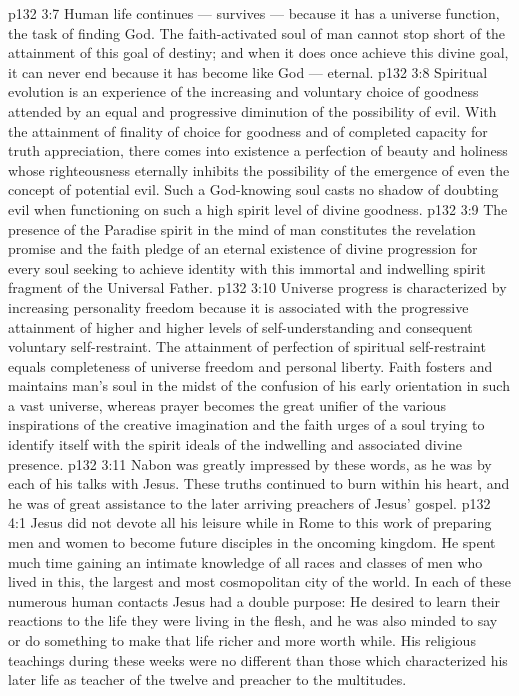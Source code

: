 \vs p132 3:7 Human life continues --- survives --- because it has a universe function, the task of finding God. The faith\hyp{}activated soul of man cannot stop short of the attainment of this goal of destiny; and when it does once achieve this divine goal, it can never end because it has become like God --- eternal.
\vs p132 3:8 \pc Spiritual evolution is an experience of the increasing and voluntary choice of goodness attended by an equal and progressive diminution of the possibility of evil. With the attainment of finality of choice for goodness and of completed capacity for truth appreciation, there comes into existence a perfection of beauty and holiness whose righteousness eternally inhibits the possibility of the emergence of even the concept of potential evil. Such a God\hyp{}knowing soul casts no shadow of doubting evil when functioning on such a high spirit level of divine goodness.
\vs p132 3:9 The presence of the Paradise spirit in the mind of man constitutes the revelation promise and the faith pledge of an eternal existence of divine progression for every soul seeking to achieve identity with this immortal and indwelling spirit fragment of the Universal Father.
\vs p132 3:10 Universe progress is characterized by increasing personality freedom because it is associated with the progressive attainment of higher and higher levels of self\hyp{}understanding and consequent voluntary self\hyp{}restraint. The attainment of perfection of spiritual self\hyp{}restraint equals completeness of universe freedom and personal liberty. Faith fosters and maintains man’s soul in the midst of the confusion of his early orientation in such a vast universe, whereas prayer becomes the great unifier of the various inspirations of the creative imagination and the faith urges of a soul trying to identify itself with the spirit ideals of the indwelling and associated divine presence.
\vs p132 3:11 \pc Nabon was greatly impressed by these words, as he was by each of his talks with Jesus. These truths continued to burn within his heart, and he was of great assistance to the later arriving preachers of Jesus’ gospel.
\vs p132 4:1 Jesus did not devote all his leisure while in Rome to this work of preparing men and women to become future disciples in the oncoming kingdom. He spent much time gaining an intimate knowledge of all races and classes of men who lived in this, the largest and most cosmopolitan city of the world. In each of these numerous human contacts Jesus had a double purpose: He desired to learn their reactions to the life they were living in the flesh, and he was also minded to say or do something to make that life richer and more worth while. His religious teachings during these weeks were no different than those which characterized his later life as teacher of the twelve and preacher to the multitudes.
